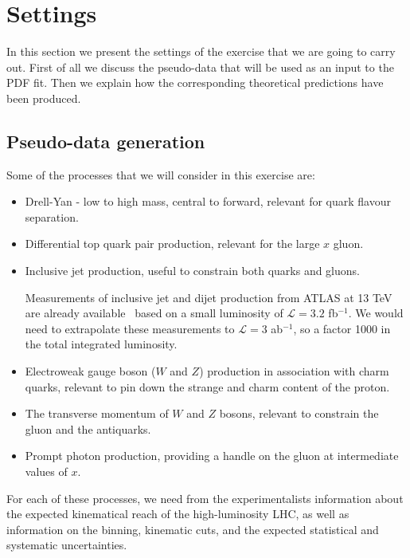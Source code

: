 \section{Settings}
\label{sec:settings}

In this section we present the settings of the exercise that
we are going to carry out.
%
First of all we discuss the pseudo-data that will be used as an input to
the PDF fit.
%
Then we explain how the corresponding theoretical predictions have been produced.

\subsection{Pseudo-data generation}

Some of the processes that we will consider in this exercise
are:

\begin{itemize}

\item Drell-Yan - low to high mass, central to forward,
  relevant for quark flavour separation.

\item   Differential top quark pair production,
  relevant for the large $x$ gluon.

\item Inclusive jet production,
  useful to constrain both quarks and gluons.

  Measurements of inclusive jet and dijet production from ATLAS at 13 TeV are
  already available~\cite{Aaboud:2017wsi}
  based on a small luminosity of $\mathcal{L}=3.2$ fb$^{-1}$.
  We would need to extrapolate these measurements to $\mathcal{L}=3$ ab$^{-1}$, so
  a factor 1000 in the total integrated luminosity.
  

\item Electroweak gauge boson ($W$ and $Z$) production
  in association with charm quarks, relevant
  to pin down the strange and charm content of the proton.

\item The transverse momentum of $W$ and $Z$ bosons,
  relevant to constrain the gluon and the antiquarks.
  
\item Prompt photon production, providing a handle
  on the gluon at intermediate values of $x$.
    
\end{itemize}  

For each of these processes, we need from the experimentalists information
about the expected kinematical reach of the high-luminosity LHC, as well
as information on the binning, kinematic cuts, and the expected statistical
and systematic uncertainties.

